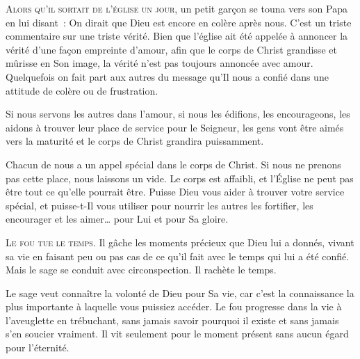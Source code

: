 \lettrine{A}{lors qu'il sortait de l'église un jour,}
 un petit garçon se touna vers son Papa  en lui disant~: 
 \og On dirait que Dieu est encore en colère après nous. \fg{}
 C'est un triste commentaire sur une triste vérité.
 Bien que l'église ait été appelée à annoncer la vérité
 d'une façon empreinte d'amour, afin que le corps de Christ grandisse
 et mûrisse en Son image, la vérité n'est pas toujours annoncée avec amour.
 Quelquefois  on fait part aux autres du message
 qu'Il nous a confié dans une attitude de colère ou de frustration. 


Si nous servons les autres dans l'amour, si nous les édifions,
 les encourageons, les aidons à trouver leur place de service
 pour le Seigneur, les gens vont être aimés vers la maturité
 \ocadr et le corps de Christ grandira puissamment.

Chacun de nous a un appel spécial dans le corps de Christ.
 Si nous ne prenons pas cette place, nous laissons un vide.
 Le corps est affaibli, et l'Église 
 ne peut pas être tout ce qu'elle pourrait être.
 Puisse Dieu vous aider à trouver votre service spécial,
 et puisse-t-Il vous utiliser pour nourrir les autres
 \ocadr les fortifier, les encourager et les aimer\dots{}
 pour Lui et pour Sa gloire.

\dvrule






\lettrine{L}{e fou tue le temps.}
 Il gâche les moments précieux que Dieu lui a donnés,
 vivant sa vie en faisant peu ou pas cas de ce qu'il fait
 avec le temps qui lui a été confié.
 Mais le sage se conduit avec circonspection. Il rachète le temps.

Le sage veut connaître la volonté de Dieu pour Sa vie,
 car c'est la connaissance la plus importante à laquelle vous puissiez accéder.
 Le fou progresse dans la vie à l'aveuglette en trébuchant,
 sans jamais savoir pourquoi il existe et sans jamais s'en soucier vraiment.
 Il vit seulement pour le moment présent sans aucun égard pour l'éternité.


